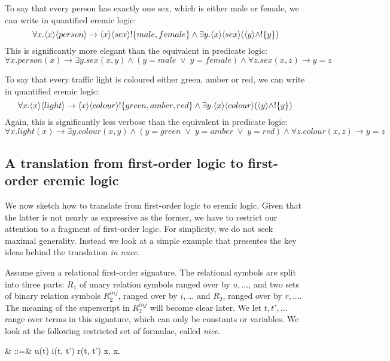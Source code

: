 To say that every person has exactly one sex, which is either male or female, we can write in quantified eremic logic:
\[
\forall x . \langle x \rangle \langle person \rangle \rightarrow \langle x \rangle \langle sex \rangle ! \{male, female\} \land \exists y . \langle x \rangle \langle sex \rangle (\langle y \rangle \land ! \{y\})
\]
This is significantly more elegant than the equivalent in predicate logic:
\[
\forall x. person(x) \rightarrow \exists y . sex(x,y) \land (y = male \; \lor \; y = female) \land \forall z . sex(x,z) \rightarrow y = z
\]

To say that every traffic light is coloured either green, amber or red, we can write in quantified eremic logic:
\[
\forall x. \langle x \rangle \langle light \rangle \rightarrow \langle x \rangle \langle colour \rangle !\{green, amber, red\} \land \exists y . \langle x \rangle \langle colour \rangle (\langle y \rangle \land !\{y\})
\]
Again, this is significantly less verbose than the equivalent in predicate logic:
\[
\forall x. light(x) \rightarrow \exists y . colour(x,y) \land (y = green \; \lor \; y = amber \; \lor \; y = red) \land \forall z . colour(x,z) \rightarrow y = z
\]

\subsection{A translation from first-order logic to first-order eremic logic}

We now sketch how to translate from first-order logic to eremic
logic. Given that the latter is not nearly as expressive as the
former, we have to restrict our attention to a fragment of first-order
logic. For simplicity, we do not seek maximal generality. Instead we
look at a simple example that presentes the key ideas behind the
translation \emph{in nuce}.

Assume given a relational first-order signature. The relational
symbols are split into three parts: $R_1$ of unary relation symbols
ranged over by $u, ...$, and two sets of binary relation symbols
$R_2^{inj}$, ranged over by $i, ...$ and $R_2$, ranged over by $r,
...$. The meaning of the superscript in $R_2^{inj}$ will become clear
later.  We let $t, t', ...$ range over terms in this signature, which
can only be constants or variables. We look at the following
restricted set of formulae, called \emph{nice}.
\begin{GRAMMAR}
  \phi
     & \quad::=\quad &
  u(t) 
     \VERTICAL 
  i(t, t') 
     \VERTICAL 
  r(t, t') 
     \VERTICAL 
  \phi \AND \psi 
     \VERTICAL 
  \forall x.\phi 
     \VERTICAL 
  \exists x.\phi
\end{GRAMMAR}

